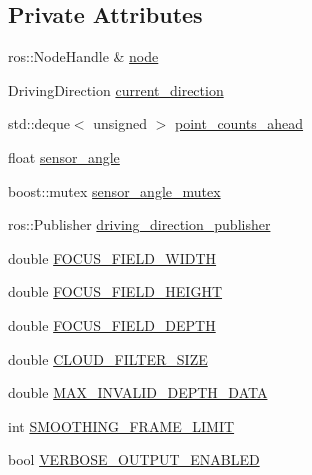 \subsection*{\-Private \-Attributes}
\begin{DoxyCompactItemize}
\item 
ros\-::\-Node\-Handle \& \hyperlink{class_r_p_obstacle_avoidance_node_acb163610c79438c473c4f8f8f7531ae2}{node}
\item 
\-Driving\-Direction \hyperlink{class_r_p_obstacle_avoidance_node_aa5e938ed834639efa94dd19939acdc59}{current\-\_\-direction}
\item 
std\-::deque$<$ unsigned $>$ \hyperlink{class_r_p_obstacle_avoidance_node_ad7c74afdb4f668cef629901defba0852}{point\-\_\-counts\-\_\-ahead}
\item 
float \hyperlink{class_r_p_obstacle_avoidance_node_a127cdfd4cd666862eababa52877a6a30}{sensor\-\_\-angle}
\item 
boost\-::mutex \hyperlink{class_r_p_obstacle_avoidance_node_a230a3dab379f4a70f38b45763f5e48bb}{sensor\-\_\-angle\-\_\-mutex}
\item 
ros\-::\-Publisher \hyperlink{class_r_p_obstacle_avoidance_node_a1cbdab74a6f919f479eb11bfe043992a}{driving\-\_\-direction\-\_\-publisher}
\item 
double \hyperlink{class_r_p_obstacle_avoidance_node_ad2fd3ecf37f7cb251a5beaf9f5bb44b8}{\-F\-O\-C\-U\-S\-\_\-\-F\-I\-E\-L\-D\-\_\-\-W\-I\-D\-T\-H}
\item 
double \hyperlink{class_r_p_obstacle_avoidance_node_ada49702c116a61ccc237d19349805c82}{\-F\-O\-C\-U\-S\-\_\-\-F\-I\-E\-L\-D\-\_\-\-H\-E\-I\-G\-H\-T}
\item 
double \hyperlink{class_r_p_obstacle_avoidance_node_a5d8b47cc4e9eb4a80a0bfd85d82dbb67}{\-F\-O\-C\-U\-S\-\_\-\-F\-I\-E\-L\-D\-\_\-\-D\-E\-P\-T\-H}
\item 
double \hyperlink{class_r_p_obstacle_avoidance_node_a03b429995334c5bc694296dc7d4e7c8f}{\-C\-L\-O\-U\-D\-\_\-\-F\-I\-L\-T\-E\-R\-\_\-\-S\-I\-Z\-E}
\item 
double \hyperlink{class_r_p_obstacle_avoidance_node_a577ee6e3b2d694e01e9e7d9e7ec2766d}{\-M\-A\-X\-\_\-\-I\-N\-V\-A\-L\-I\-D\-\_\-\-D\-E\-P\-T\-H\-\_\-\-D\-A\-T\-A}
\item 
int \hyperlink{class_r_p_obstacle_avoidance_node_aa8ba56ebe9cb6ad7865458a3be287b70}{\-S\-M\-O\-O\-T\-H\-I\-N\-G\-\_\-\-F\-R\-A\-M\-E\-\_\-\-L\-I\-M\-I\-T}
\item 
bool \hyperlink{class_r_p_obstacle_avoidance_node_a16106e57285f417f8c883c3a882aaa45}{\-V\-E\-R\-B\-O\-S\-E\-\_\-\-O\-U\-T\-P\-U\-T\-\_\-\-E\-N\-A\-B\-L\-E\-D}
\end{DoxyCompactItemize}


